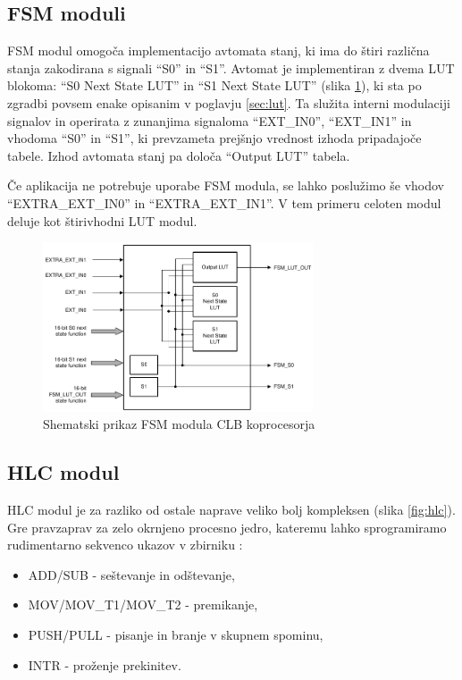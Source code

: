 \documentclass[a4paper]{article}
\begin{document}
\begin{sloppypar}
\subsection{FSM moduli}
FSM modul omogoča implementacijo avtomata stanj, ki ima do štiri različna stanja zakodirana s signali ``S0'' in ``S1''. Avtomat je implementiran z dvema
LUT blokoma: ``S0 Next State LUT'' in ``S1 Next State
LUT'' (slika \ref{fig:fsm}), ki sta po zgradbi povsem enake opisanim v poglavju
\ref{sec:lut}. Ta služita interni modulaciji signalov in operirata z zunanjima
signaloma ``EXT\_IN0'', ``EXT\_IN1'' in vhodoma ``S0'' in ``S1'', ki prevzameta
prejšnjo vrednost izhoda pripadajoče tabele. Izhod avtomata stanj pa določa
``Output LUT'' tabela.

Če aplikacija ne potrebuje uporabe FSM modula, se lahko poslužimo še vhodov
``EXTRA\_EXT\_IN0'' in ``EXTRA\_EXT\_IN1''. V tem primeru celoten modul deluje
kot štirivhodni LUT modul.

\begin{figure}[htb]
    \centerline{\includegraphics[width=8cm]{shema_fsm}}
    \caption{Shematski prikaz FSM modula CLB koprocesorja
             \cite[Pogl.~26.4.3]{mcu-ref-manual}}
    \label{fig:fsm} 
\end{figure} 

\subsection{HLC modul}\label{sec:hlc}
HLC modul je za razliko od ostale naprave veliko bolj kompleksen (slika
\ref{fig:hlc}).  Gre pravzaprav za zelo okrnjeno procesno jedro, kateremu lahko
sprogramiramo rudimentarno sekvenco ukazov v zbirniku
\cite[Pogl.~26.4.6.2]{mcu-ref-manual}:
\begin{itemize}
    \item ADD/SUB - seštevanje in odštevanje,
    \item MOV/MOV\_T1/MOV\_T2 - premikanje,
    \item PUSH/PULL - pisanje in branje v skupnem spominu,
    \item INTR - proženje prekinitev.
\end{itemize}


\end{sloppypar}
\end{document}
